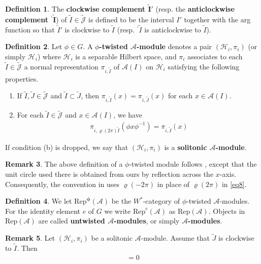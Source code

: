\documentclass[11pt,b5paper,notitlepage]{article}
\theoremstyle{definition}
\newtheorem{df}{Definition}[section]
\newtheorem{rem}[df]{Remark}
\theoremstyle{plain}
\newcommand{\wtd}{\widetilde}
\newcommand{\Rep}{\mathrm{Rep}}
\newcommand{\Jtd}{\widetilde{\mathcal J}}
\newcommand{\bpr}{{}^\backprime}
\newcommand{\MA}{\mathcal A}
\newcommand{\MH}{\mathcal H}
\numberwithin{equation}{section}
\begin{document}
\begin{df}\label{lb8}
The \textbf{clockwise complement $\pmb{\wtd I'}$} (resp. the \textbf{anticlockwise complement $\pmb{\bpr\wtd I}$}) of $\wtd I\in\Jtd$ is defined to be the interval $I'$ together with the arg function so that $\wtd I'$ is clockwise to $\wtd I$ (resp. $\bpr\wtd I$ is anticlockwise to $\wtd I$).
\end{df}


\begin{df}\label{lb3}
Let $\phi\in G$. A \textbf{$\phi$-twisted $\MA$-module} denotes a pair $(\MH_i,\pi_i)$ (or simply $\MH_i$) where $\MH_i$ is a separable Hilbert space, and $\pi_i$ associates to each $\wtd I\in\Jtd$ a normal representation $\pi_{i,\wtd I}$ of $\MA(I)$ on $\MH_i$ satisfying the following properties.
\begin{enumerate}[label=(\alph*)]
\item If $\wtd I,\wtd J\in\Jtd$ and $\wtd I\subset\wtd J$, then $\pi_{i,\wtd I}(x)=\pi_{i,\wtd J}(x)$ for each $x\in\MA(I)$.
\item For each $\wtd I\in\Jtd$ and $x\in\MA(I)$, we have
\begin{align}\label{eq8}
\pi_{i,\varrho(2\pi)\wtd I}(\phi x\phi^{-1})=\pi_{i,\wtd I}(x)
\end{align}
\end{enumerate}
If condition (b) is dropped, we say that $(\MH_i,\pi_i)$ is a \textbf{solitonic $\MA$-module}.
\end{df}

\begin{rem}\label{lb138}
The above definition of a $\phi$-twisted module follows \cite[Sec. 3.1]{MS26a}, except that the unit circle used there is obtained from ours by reflection across the $x$-axis. Consequently, the convention in \cite{MS26a,MS26b} uses $\varrho(-2\pi)$ in place of $\varrho(2\pi)$ in \eqref{eq8}. 
\end{rem}



\begin{df}\label{lb132}
We let $\pmb{\Rep^\phi(\MA)}$ be the $W^*$-category of $\phi$-twisted $\MA$-modules. For the identity element $e$ of $G$ we write $\Rep^e(\MA)$ as $\pmb{\Rep(\MA)}$. Objects in $\Rep(\MA)$ are called \textbf{untwisted $\MA$-modules}, or simply \textbf{$\MA$-modules}. 
\end{df}


\begin{rem}\label{lb133}
Let $(\MH_i,\pi_i)$ be a solitonic $\MA$-module. Assume that $\wtd J$ is clockwise to $\wtd I$. Then
\begin{align*}
[\pi_{i,\wtd I}(\MA(I)),\pi_{i,\wtd J}(\MA(J))]=0
\end{align*}
\end{rem}
\end{document}
